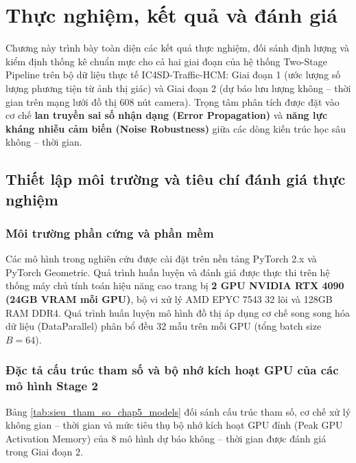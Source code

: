 \chapter{Thực nghiệm, kết quả và đánh giá}
\label{chap:thuc_nghiem}

Chương này trình bày toàn diện các kết quả thực nghiệm, đối sánh định lượng và kiểm định thống kê chuẩn mực cho cả hai giai đoạn của hệ thống Two-Stage Pipeline trên bộ dữ liệu thực tế IC4SD-Traffic-HCM: Giai đoạn 1 (ước lượng số lượng phương tiện từ ảnh thị giác) và Giai đoạn 2 (dự báo lưu lượng không -- thời gian trên mạng lưới đồ thị 608 nút camera). Trọng tâm phân tích được đặt vào cơ chế \textbf{lan truyền sai số nhận dạng (Error Propagation)} và \textbf{năng lực kháng nhiễu cảm biến (Noise Robustness)} giữa các dòng kiến trúc học sâu không -- thời gian.

\section{Thiết lập môi trường và tiêu chí đánh giá thực nghiệm}
\label{sec:thiet_lap_moi_truong}

\subsection{Môi trường phần cứng và phần mềm}
Các mô hình trong nghiên cứu được cài đặt trên nền tảng PyTorch 2.x và PyTorch Geometric. Quá trình huấn luyện và đánh giá được thực thi trên hệ thống máy chủ tính toán hiệu năng cao trang bị \textbf{2 GPU NVIDIA RTX 4090 (24GB VRAM mỗi GPU)}, bộ vi xử lý AMD EPYC 7543 32 lõi và 128GB RAM DDR4. Quá trình huấn luyện mô hình đồ thị áp dụng cơ chế song song hóa dữ liệu (DataParallel) phân bổ đều 32 mẫu trên mỗi GPU (tổng batch size $B=64$).

\subsection{Đặc tả cấu trúc tham số và bộ nhớ kích hoạt GPU của các mô hình Stage 2}
Bảng \ref{tab:sieu_tham_so_chap5_models} đối sánh cấu trúc tham số, cơ chế xử lý không gian -- thời gian và mức tiêu thụ bộ nhớ kích hoạt GPU đỉnh (Peak GPU Activation Memory) của 8 mô hình dự báo không -- thời gian được đánh giá trong Giai đoạn 2.

